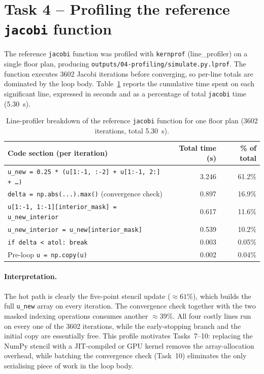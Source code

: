 \documentclass[11pt,a4paper]{article}
\begin{document}
\section{Task 4 -- Profiling the reference \texttt{jacobi} function}

The reference \texttt{jacobi} function was profiled with \texttt{kernprof}
(line\_profiler) on a single floor plan, producing
\texttt{outputs/04-profiling/simulate.py.lprof}. The function executes 3602
Jacobi iterations before converging, so per-line totals are dominated by the
loop body. Table~\ref{tab:task4-profiling} reports the cumulative time spent on
each significant line, expressed in seconds and as a percentage of total
\texttt{jacobi} time (\SI{5.30}{\second}).

\begin{table}[H]
    \centering
    \begin{tabular}{lrr}
        \toprule
        Code section (per iteration) & Total time (s) & \% of total \\
        \midrule
        \texttt{u\_new = 0.25 * (u[1:-1, :-2] + u[1:-1, 2:] + \ldots)} & 3.246 & 61.2\% \\
        \texttt{delta = np.abs(...).max()} (convergence check) & 0.897 & 16.9\% \\
        \texttt{u[1:-1, 1:-1][interior\_mask] = u\_new\_interior} & 0.617 & 11.6\% \\
        \texttt{u\_new\_interior = u\_new[interior\_mask]} & 0.539 & 10.2\% \\
        \texttt{if delta < atol: break} & 0.003 & 0.05\% \\
        Pre-loop \texttt{u = np.copy(u)} & 0.002 & 0.04\% \\
        \bottomrule
    \end{tabular}
    \caption{Line-profiler breakdown of the reference \texttt{jacobi} function
    for one floor plan (3602 iterations, total \SI{5.30}{\second}).}
    \label{tab:task4-profiling}
\end{table}

\paragraph{Interpretation.} The hot path is clearly the five-point stencil
update (\(\approx 61\%\)), which builds the full \texttt{u\_new} array on every
iteration. The convergence check together with the two masked indexing
operations consumes another \(\approx 39\%\). All four costly lines run on every
one of the 3602 iterations, while the early-stopping branch and the initial
copy are essentially free. This profile motivates Tasks~7--10: replacing the
NumPy stencil with a JIT-compiled or GPU kernel removes the array-allocation
overhead, while batching the convergence check (Task~10) eliminates the only
serialising piece of work in the loop body.
\end{document}
